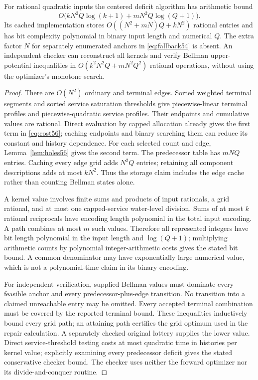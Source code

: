 \begin{proposition}\label{prop:cost56}
For rational quadratic inputs the centered deficit algorithm has arithmetic bound
\begin{equation}\label{eq:cost56}
 O\bigl(kN^2Q\log(k+1)+mN^2Q\log(Q+1)\bigr).
\end{equation}
Its cached implementation stores $O((N^2+mN)Q+kN^2)$ rational entries and has bit complexity polynomial in binary input length and numerical $Q$. The extra factor $N$ for separately enumerated anchors in \eqref{eq:fallback54} is absent. An independent checker can reconstruct all kernels and verify Bellman upper-potential inequalities in
$O(k^2N^2Q+mN^2Q^2)$ rational operations, without using the optimizer's monotone search.
\end{proposition}
\begin{proof}
There are $O(N^2)$ ordinary and terminal edges. Sorted weighted terminal segments and sorted service saturation thresholds give piecewise-linear terminal profiles and piecewise-quadratic service profiles. Their endpoints and cumulative values are rational. Direct evaluation by capped allocation already gives the first term in \eqref{eq:cost56}; caching endpoints and binary searching them can reduce its constant and history dependence. For each selected count and edge, Lemma~\ref{lem:holes56} gives the second term. The predecessor table has $mNQ$ entries. Caching every edge grid adds $N^2Q$ entries; retaining all component descriptions adds at most $kN^2$. Thus the storage claim includes the edge cache rather than counting Bellman states alone.

A kernel value involves finite sums and products of input rationals, a grid rational, and at most one capped-service water-level division. Sums of at most $k$ rational reciprocals have encoding length polynomial in the total input encoding. A path combines at most $m$ such values. Therefore all represented integers have bit length polynomial in the input length and $\log(Q+1)$; multiplying arithmetic counts by polynomial integer-arithmetic costs gives the stated bit bound. A common denominator may have exponentially large numerical value, which is not a polynomial-time claim in its binary encoding.

For independent verification, supplied Bellman values must dominate every feasible anchor and every predecessor-plus-edge transition. No transition into a claimed unreachable entry may be omitted. Every accepted terminal combination must be covered by the reported terminal bound. These inequalities inductively bound every grid path; an attaining path certifies the grid optimum used in the repair calculation. A separately checked original lottery supplies the lower value. Direct service-threshold testing costs at most quadratic time in histories per kernel value; explicitly examining every predecessor deficit gives the stated conservative checker bound. The checker uses neither the forward optimizer nor its divide-and-conquer routine.
\end{proof}

